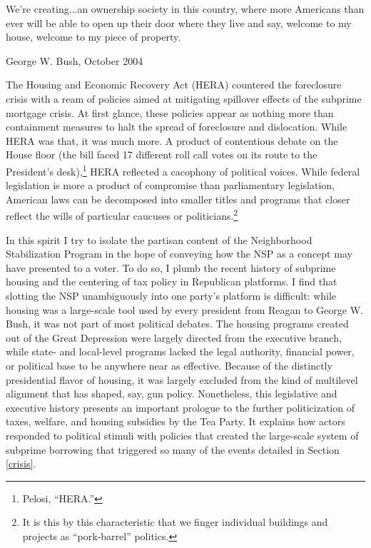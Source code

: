 \documentclass[12pt,oneside]{psthesis}
\begin{document}
\epigraph{We're creating...an ownership society in this country, where more Americans than ever will be able to open up their door where they live and say, welcome to my house, welcome to my piece of property.}{George W. Bush, October 2004}

The Housing and Economic Recovery Act (HERA) countered the foreclosure crisis with a ream of policies aimed at mitigating spillover effects of the subprime mortgage crisis.
At first glance, these policies appear as nothing more than containment measures to halt the spread of foreclosure and dislocation.
While HERA was that, it was much more.
A product of contentious debate on the House floor (the bill faced 17 different roll call votes on its route to the President's desk),\footnote{Pelosi, ``HERA.''} HERA reflected a cacophony of political voices.
While federal legislation is more a product of compromise than parliamentary legislation, American laws can be decomposed into smaller titles and programs that closer reflect the wills of particular caucuses or politicians.\footnote{It is this by this characteristic that we finger individual buildings and projects as ``pork-barrel'' politics.}

In this spirit I try to isolate the partisan content of the Neighborhood Stabilization Program in the hope of conveying how the NSP as a concept may have presented to a voter.
To do so, I plumb the recent history of subprime housing and the centering of tax policy in Republican platforms.
I find that slotting the NSP unambiguously into one party's platform is difficult: while housing was a large-scale tool used by every president from Reagan to George W. Bush, it was not part of most political debates.
The housing programs created out of the Great Depression were largely directed from the executive branch, while state- and local-level programs lacked the legal authority, financial power, or political base to be anywhere near as effective.
Because of the distinctly presidential flavor of housing, it was largely excluded from the kind of multilevel alignment that has shaped, say, gun policy.
Nonetheless, this legislative and executive history presents an important prologue to the further politicization of taxes, welfare, and housing subsidies by the Tea Party.
It explains how actors responded to political stimuli with policies that created the large-scale system of subprime borrowing that triggered so many of the events detailed in Section \ref{crisis}.
\end{document}
